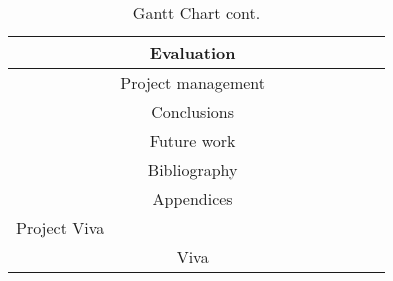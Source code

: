 \begin{sidewaystable}[h]
\begin{tabular}{|c|c|c|c|c|c|c|c|c|}
            \hline
             & Evaluation & & & & & & \cellcolor{lightgray} & \cellcolor{lightgray}\\
            \hline
             & Project management & & & & & & \cellcolor{lightgray} & \cellcolor{lightgray}\\
            \hline
             & Conclusions & & & & & & \cellcolor{lightgray} & \cellcolor{lightgray}\\
            \hline
             & Future work & & & & & & & \cellcolor{lightgray}\\
            \hline
             & Bibliography & & & & & & & \cellcolor{lightgray}\\
            \hline
             & Appendices & & & & & & & \cellcolor{lightgray}\\
            \hline
            \hline
            Project Viva & & & & & & & & \cellcolor{gray}\\
            \hline
             & Viva & & & & & & & \cellcolor{lightgray}\\
            \hline
        \end{tabular}
        \caption{Gantt Chart cont.}
    \end{sidewaystable}